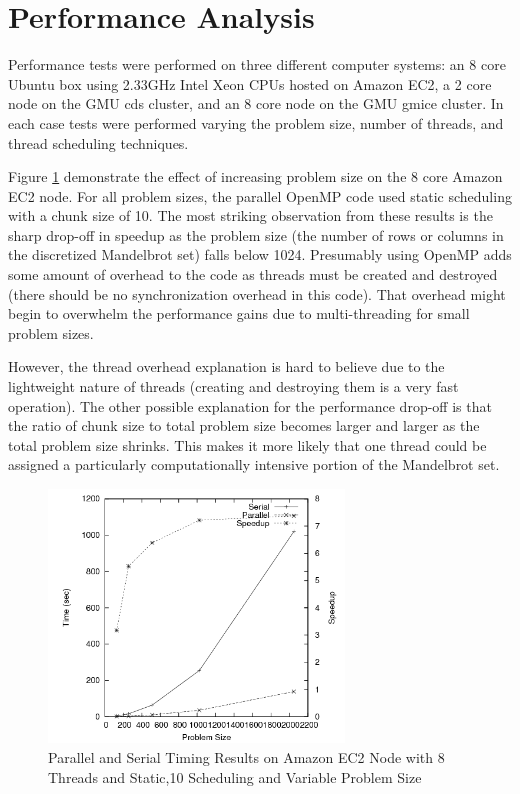 \documentclass{article}
\begin{document}
\section{Performance Analysis}

Performance tests were performed on three different computer systems: an 8 core Ubuntu box using 2.33GHz Intel Xeon CPUs hosted on Amazon EC2, a 2 core node on the GMU cds cluster, and an 8 core node on the GMU gmice cluster. In each case tests were performed varying the problem size, number of threads, and thread scheduling techniques.

Figure \ref{amazon_n} demonstrate the effect of increasing problem size on the 8 core Amazon EC2 node. For all problem sizes, the parallel OpenMP code used static scheduling with a chunk size of 10. The most striking observation from these results is the sharp drop-off in speedup as the problem size (the number of rows or columns in the discretized Mandelbrot set) falls below 1024. Presumably using OpenMP adds some amount of overhead to the code as threads must be created and destroyed (there should be no synchronization overhead in this code). That overhead might begin to overwhelm the performance gains due to multi-threading for small problem sizes. 

However, the thread overhead explanation is hard to believe due to the lightweight nature of threads (creating and destroying them is a very fast operation). The other possible explanation for the performance drop-off is that the ratio of chunk size to total problem size becomes larger and larger as the total problem size shrinks. This makes it more likely that one thread could be assigned a particularly computationally intensive portion of the Mandelbrot set.

\begin{figure}
\centering
\includegraphics[width=0.7\textwidth]{../data/amazon_n.png}
\caption{Parallel and Serial Timing Results on Amazon EC2 Node with 8 Threads and Static,10 Scheduling and Variable Problem Size}
\label{amazon_n}
\end{figure}
\end{document}
